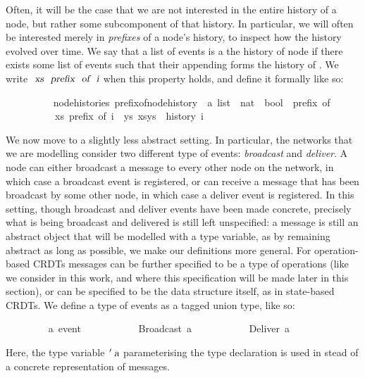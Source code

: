 \documentclass[acmlarge,review,anonymous]{acmart}\settopmatter{printfolios=true}
\begin{document}
Often, it will be the case that we are not interested in the entire history of a node, but rather some subcomponent of that history.
In particular, we will often be interested merely in \emph{prefixes} of a node's history, to inspect how the history evolved over time.
We say that a list of events  is a  the history of node  if there exists some list of events  such that their appending forms the history of .
We write $\isa{xs}\ \isa{prefix}\ \isa{of}\ \isa{i}$ when this property holds, and define it formally like so:
\\
\begin{isabellebody}
\ \ \ \ \ \ \ \  {\isacharparenleft}\ node{\isacharunderscore}histories{\isacharparenright}\ prefix{\isacharunderscore}of{\isacharunderscore}node{\isacharunderscore}history\ {\isacharcolon}{\isacharcolon}\ {\isachardoublequoteopen}{\isacharprime}a\ list\ {\isasymRightarrow}\ nat\ {\isasymRightarrow}\ bool{\isachardoublequoteclose}\ {\isacharparenleft}\ {\isachardoublequoteopen}prefix\ of{\isachardoublequoteclose}\ {}{}{\isacharparenright}\ \isanewline
\ \ \ \ \ \ \ \ \ \ {\isachardoublequoteopen}xs\ prefix\ of\ i\ {\isasymequiv}\ {\isasymexists}ys{\isachardot}\ xs{\isacharat}ys\ {\isacharequal}\ history\ i{\isachardoublequoteclose}
\end{isabellebody}
\vspace{\baselineskip}
We now move to a slightly less abstract setting.
In particular, the networks that we are modelling consider two different type of events: \emph{broadcast} and \emph{deliver}.
A node can either broadcast a message to every other node on the network, in which case a broadcast event is registered, or can receive a message that has been broadcast by some other node, in which case a deliver event is registered.
In this setting, though broadcast and deliver events have been made concrete, precisely what is being broadcast and delivered is still left unspecified: a message is still an abstract object that will be modelled with a type variable, as by remaining abstract as long as possible, we make our definitions more general.
For operation-based CRDTs messages can be further specified to be a type of operations (like we consider in this work, and where this specification will be made later in this section), or can be specified to be the data structure itself, as in state-based CRDTs.
We define a type of events as a tagged union type, like so:
\\
\begin{isabellebody}
\ \ \ \ \ \ \ \  {\isacharprime}a\ event\isanewline
\ \ \ \ \ \ \ \ \ \ {\isacharequal}\ Broadcast\ {\isacharprime}a\isanewline
\ \ \ \ \ \ \ \ \ \ {\isacharbar}\ Deliver\ {\isacharprime}a
\end{isabellebody}
\vspace{\baselineskip}
Here, the type variable $\isacharprime\isa{a}$ parameterising the type declaration is used in stead of a concrete representation of messages.
\end{document}
